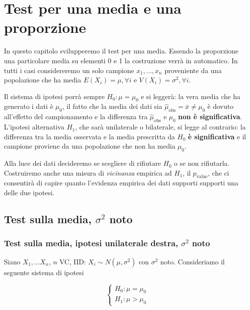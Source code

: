 \documentclass[
  11pt,
]{book}
\theoremstyle{mytheoremstyle}
\theoremstyle{mydefstyle}
\begin{document}
\chapter{Test per una media e una proporzione}\label{test-per-una-media-e-una-proporzione}

In questo capitolo svilupperemo il test per una media. Essendo la
proporzione una particolare media su elementi 0 e 1 la costruzione verrà
in automatico. In tutti i casi considereremo un solo campione
\(x_1,...,x_n\) proveniente da una popolazione che ha media
\(E(X_i)=\mu, \forall i\) e \(V(X_i)=\sigma^2, \forall i\).

Il sistema di ipotesi porrà sempre \(H_0:\mu=\mu_0\) e si leggerà: la vera
media che ha generato i dati è \(\mu_0\), il fatto che la media dei dati
sia \(\hat\mu_\text{obs}=\bar x\ne\mu_0\) è dovuto all'effetto del campionamento e la
differenza tra \(\hat\mu_\text{obs}\) e \(\mu_0\) \textbf{non è significativa}. L'ipotesi
alternativa \(H_1\), che sarà unilaterale o bilaterale, si legge al
contrario: la differenza tra la media osservata e la media prescritta da
\(H_0\) \textbf{è significativa} e il campione proviene da una popolazione che
non ha media \(\mu_0\).

Alla luce dei dati decideremo se scegliere di rifiutare \(H_0\) o se non
rifiutarla. Costruiremo anche una misura di \emph{vicinanza} empirica ad
\(H_1\), il \(p_{\text{value}}\), che ci consentirà di capire quanto
l'evidenza empirica dei dati supporti supporti una delle due ipotesi.

\section{\texorpdfstring{Test sulla media, \(\sigma^2\) noto}{Test sulla media, \textbackslash sigma\^{}2 noto}}\label{test-sulla-media-sigma2-noto}

\subsection{\texorpdfstring{Test sulla media, ipotesi unilaterale destra, \(\sigma^2\) noto}{Test sulla media, ipotesi unilaterale destra, \textbackslash sigma\^{}2 noto}}\label{test-sulla-media-ipotesi-unilaterale-destra-sigma2-noto}

Siano \(X_1,...X_n\), \(n\) VC, IID: \(X_i\sim N(\mu,\sigma^2)\) con
\(\sigma^2\) noto. Consideriamo il seguente sistema di ipotesi

\[\begin{cases}
H_0:\mu=\mu_0\\
H_1:\mu>\mu_0
\end{cases}\]
\end{document}
